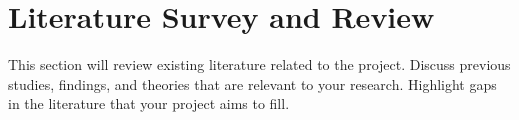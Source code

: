 \section{Literature Survey and Review}
\label{sec:literature}
This section will review existing literature related to the project. Discuss previous studies, findings, and theories that are relevant to your research. Highlight gaps in the literature that your project aims to fill.
